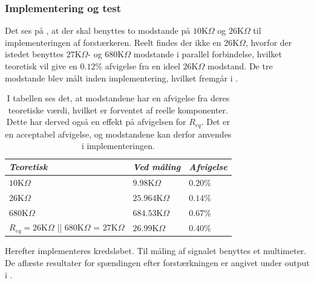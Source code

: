 \subsubsection{Implementering og test}
Det ses på , at der skal benyttes to modstande på $10$K$\Omega$ og $26$K$\Omega$ til implementeringen af forstærkeren. Reelt findes der ikke en $26$K$\Omega$, hvorfor der istedet benyttes $27$K$\Omega$- og $680$K$\Omega$ modstande i parallel forbindelse, hvilket teoretisk vil give en $0.12$\% afvigelse fra en ideel $26$K$\Omega$ modstand. De tre modstande blev målt inden implementering, hvilket fremgår i .
\begin{table}[H]
	\centering
	\begin{tabular}{|l|l|l|}
		\hline
		\textit{Teoretisk}  & \textit{Ved måling} & \textit{Afvigelse} \\ \hline
		$10$K$\Omega$       & $9.98$K$\Omega$     & $0.20$\%               \\ \hline
		$26$K$\Omega$      &  $25.964$K$\Omega$   & $0.14$\% \\ \hline
		$680$K$\Omega$      & $684.53$K$\Omega$   & $0.67$\%               \\ \hline
$R_{eq} = 26$K$\Omega$ || $680$K$\Omega$ = $27$K$\Omega$       & $26.99$K$\Omega$    & $0.40$\%               \\ \hline
	\end{tabular}
	\caption{I tabellen ses det, at modstandene har en afvigelse fra deres teoretiske værdi, hvilket er forventet af reelle komponenter. Dette har derved også en effekt på afvigelsen for $R_{eq}$. Det er en acceptabel afvigelse, og modstandene kan derfor anvendes i implementeringen.}
	\label{Tab:modstand_faktor18}
\end{table}
\noindent Herefter implementeres kredsløbet. Til måling af signalet benyttes et multimeter. De aflæste resultater for spændingen efter forstærkningen er angivet under output i .\
